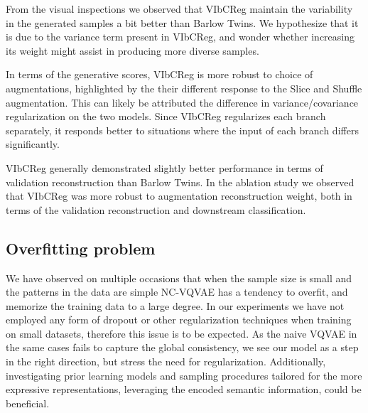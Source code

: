 \documentclass[../../thesis.tex]{subfiles}
\begin{document}
From the visual inspections we observed that VIbCReg maintain the variability in the generated samples a bit better than Barlow Twins. We hypothesize that it is due to the variance term present in VIbCReg, and wonder whether increasing its weight might assist in producing more diverse samples. \newline

In terms of the generative scores, VIbCReg is more robust to choice of augmentations, highlighted by the their different response to the Slice and Shuffle augmentation. This can likely be attributed the difference in variance/covariance regularization on the two models. Since VIbCReg regularizes each branch separately, it responds better to situations where the input of each branch differs significantly. \newline

VIbCReg generally demonstrated slightly better performance in terms of validation reconstruction than Barlow Twins. In the ablation study we observed that VIbCReg was more robust to augmentation reconstruction weight, both in terms of the validation reconstruction and downstream classification.

\subsection*{Overfitting problem}

We have observed on multiple occasions that when the sample size is small and the patterns in the data are simple NC-VQVAE has a tendency to overfit, and memorize the training data to a large degree. In our experiments we have not employed any form of dropout or other regularization techniques when training on small datasets, therefore this issue is to be expected. As the naive VQVAE in the same cases fails to capture the global consistency, we see our model as a step in the right direction, but stress the need for regularization. Additionally, investigating prior learning models and sampling procedures tailored for the more expressive representations, leveraging the encoded semantic information, could be beneficial. 
\end{document}

